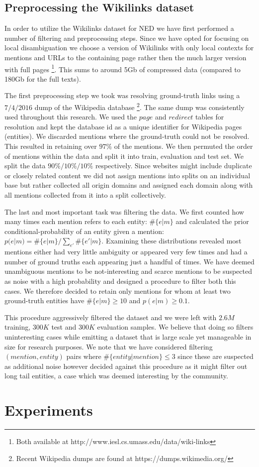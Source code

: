 \documentclass[11pt]{article}
\begin{document}
\subsection{Preprocessing the Wikilinks dataset}

In order to utilize the Wikilinks dataset for NED we have first performed a number of filtering and preprocessing steps. Since we have opted for focusing on local disambiguation we choose a version of Wikilinks with only local contexts for mentions and URLs to the containing page rather then the much larger version with full pages \footnote{Both available at http://www.iesl.cs.umass.edu/data/wiki-links}. This sums to around 5Gb of compressed data (compared to 180Gb for the full texts).

The first preprocessing step we took was resolving ground-truth links using a $7/4/2016$ dump of the Wikipedia database \footnote{Recent Wikipedia dumps are found at https://dumps.wikimedia.org/}. The same dump was consistently used throughout this research. We used the $page$ and $redirect$ tables for resolution and kept the database id as a unique identifier for Wikipedia pages (entities). We discarded mentions where the ground-truth could not be resolved. This resulted in retaining over $97\%$ of the mentions. We then permuted the order of mentions within the data and split it into train, evaluation and test set. We split the data $90\% / 10\% / 10\%$ respectively. Since websites might include duplicate or closely related content we did not assign mentions into splits on an individual base but rather collected all origin domains and assigned each domain along with all mentions collected from it into a split collectively.

The last and most important task was filtering the data. We first counted how many times each mention refers to each entity: $\#\{e|m\}$ and calculated the prior conditional-probability of an entity given a mention: $p(e|m)=\#\{e|m\}/\sum_{e'}\#\{e'|m\}$. Examining these distributions revealed most mentions either had very little ambiguity or appeared very few times and had a number of ground truths each appearing just a handful of times. We have deemed unambiguous mentions to be not-interesting and scarce mentions to be suspected as noise with a high probability and designed a procedure to filter both this cases. We therefore decided to retain only mentions for whom at least two ground-truth entities have $\#\{e|m\}\ge 10$ and $p(e|m)\ge0.1$. 

This procedure aggressively filtered the dataset and we were left with $2.6M$ training, $300K$ test and $300K$ evaluation samples. We believe that doing so filters uninteresting cases while emitting a dataset that is large scale yet manageable in size for research purposes. We note that we have considered filtering $(mention,entity)$ pairs where $\#\{entity|mention\}\le 3$ since these are suspected as additional noise however decided against this procedure as it might filter out long tail entities, a case which was deemed interesting by the community.

\section{Experiments}




\end{document}
